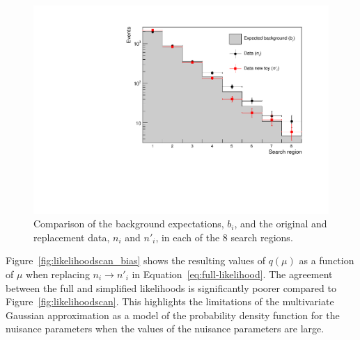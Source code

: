\begin{figure}[hbt]
  \begin{center} 
   \includegraphics[width=1.5\cmsFigWidth]{figures/newdata.pdf}
   \caption{Comparison of the background expectations, $b_{i}$, and the original and replacement data, $n_{i}$ and $n'_{i}$,  in each of the 8 search regions.}
   \label{fig:comparedata} 
  \end{center}
\end{figure}


Figure~\ref{fig:likelihoodscan_bias} shows the resulting 
values of $q(\mu)$ as a function of $\mu$ when replacing $n_{i}\rightarrow n'_{i}$ in Equation~\ref{eq:full-likelihood}. The agreement between the 
full and simplified likelihoods is significantly poorer compared to Figure~\ref{fig:likelihoodscan}. This highlights the limitations of 
the multivariate Gaussian approximation as a model of the probability density function for 
the nuisance parameters when the values of the nuisance parameters are large. 

